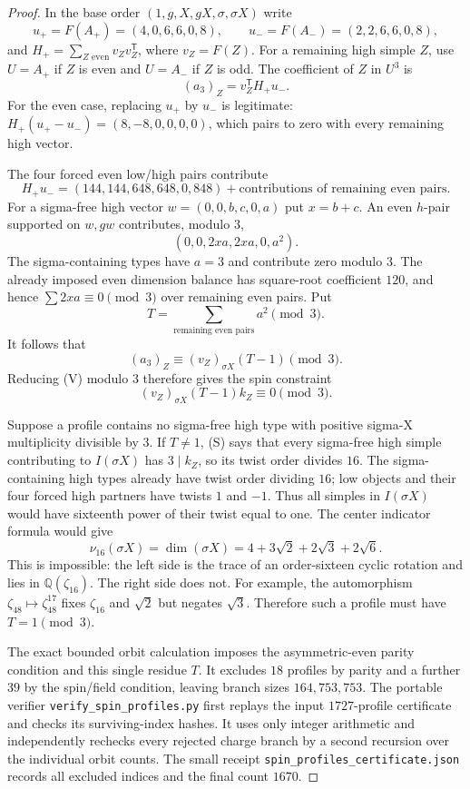 \begin{proof}
In the base order $(1,g,X,gX,\sigma,\sigma X)$ write
\[
 u_+=F(A_+)=(4,0,6,6,0,8),\qquad
 u_-=F(A_-)=(2,2,6,6,0,8),
\]
and $H_+=\sum_{Z\text{ even}}v_Zv_Z^{\mathsf T}$, where $v_Z=F(Z)$.
For a remaining high simple $Z$, use $U=A_+$ if $Z$ is even and $U=A_-$
if $Z$ is odd. The coefficient of $Z$ in $U^3$ is
\[
 (a_3)_Z=v_Z^{\mathsf T}H_+u_-.
\]
For the even case, replacing $u_+$ by $u_-$ is legitimate:
$H_+(u_+-u_-)=(8,-8,0,0,0,0)$, which pairs to zero with every
remaining high vector.

The four forced even low/high pairs contribute
\[
 H_+u_-=(144,144,648,648,0,848)
       +\text{contributions of remaining even pairs}.
\]
For a sigma-free high vector
$w=(0,0,b,c,0,a)$ put $x=b+c$. An even $h$-pair supported on
$w,gw$ contributes, modulo $3$,
\[
 (0,0,2xa,2xa,0,a^2).
\]
The sigma-containing types have $a=3$ and contribute zero modulo $3$.
The already imposed even dimension balance has square-root coefficient
$120$, and hence $\sum 2xa\equiv0\pmod3$ over remaining even pairs.
Put
\[
 T=\sum_{\text{remaining even pairs}}a^2\pmod3.
\]
It follows that
\[
 (a_3)_Z\equiv (v_Z)_{\sigma X}(T-1)\pmod3.
\]
Reducing (V) modulo $3$ therefore gives the spin constraint
\[
 (v_Z)_{\sigma X}(T-1)k_Z\equiv0\pmod3.                 \tag{S}
\]

Suppose a profile contains no sigma-free high type with positive
sigma-X multiplicity divisible by $3$. If $T\ne1$, (S) says that every
sigma-free high simple contributing to $I(\sigma X)$ has $3\mid k_Z$,
so its twist order divides $16$. The sigma-containing high types already
have twist order dividing $16$; low objects and their four forced high
partners have twists $1$ and $-1$. Thus all simples in $I(\sigma X)$
would have sixteenth power of their twist equal to one. The center
indicator formula would give
\[
 \nu_{16}(\sigma X)=\dim(\sigma X)
       =4+3\sqrt2+2\sqrt3+2\sqrt6.
\]
This is impossible: the left side is the trace of an order-sixteen cyclic
rotation and lies in $\mathbb Q(\zeta_{16})$. The right side does not.
For example, the automorphism $\zeta_{48}\mapsto\zeta_{48}^{17}$ fixes
$\zeta_{16}$ and $\sqrt2$ but negates $\sqrt3$.
Therefore such a profile must have $T=1\pmod3$.

The exact bounded orbit calculation imposes the
asymmetric-even parity condition and this single residue $T$.
It excludes $18$ profiles by parity and a further $39$ by the spin/field
condition, leaving branch sizes $164,753,753$.
The portable verifier \texttt{verify\_spin\_profiles.py} first replays the
input $1727$-profile certificate and checks its surviving-index hashes.
It uses only integer arithmetic and independently rechecks every rejected
charge branch by a second recursion over the individual orbit counts.
The small receipt \texttt{spin\_profiles\_certificate.json} records all
excluded indices and the final count $1670$.
\end{proof}


